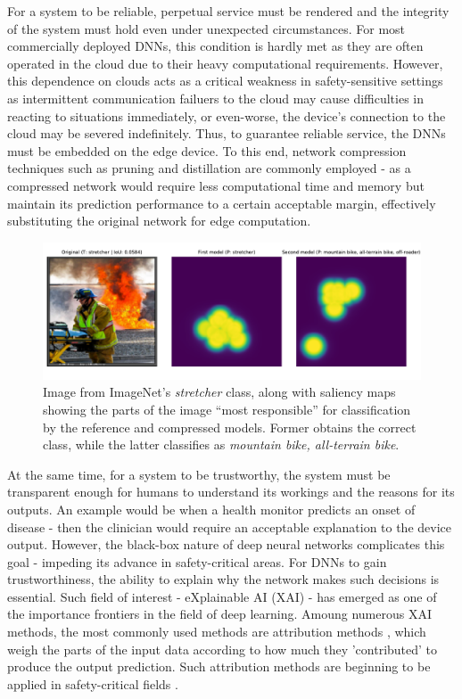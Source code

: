 For a system to be reliable, perpetual service 
must be rendered and the integrity of the system 
must hold even under unexpected circumstances.
%
%
For most commercially deployed DNNs, this condition 
is hardly met as they are often operated in the 
cloud due to their heavy computational requirements.
%
%
However, this dependence on clouds acts as a 
critical weakness in safety-sensitive settings 
as intermittent communication failuers to the 
cloud may cause difficulties in reacting to 
situations immediately, or even-worse, 
the device's connection to the cloud may be 
severed indefinitely.
%
%
Thus, to guarantee reliable service, 
the DNNs must be embedded on the edge device.
%
%
%
To this end, network compression techniques such 
as pruning \cite{han2015deep,li2016pruning} and distillation \cite{hinton2015distilling,zagoruyko2016paying} 
are commonly employed - as a compressed network 
would require less computational time and memory 
but maintain its prediction performance to a 
certain acceptable margin, effectively substituting 
the original network for edge computation.
\begin{figure}[!h]
    \centering
    \includegraphics[width=\linewidth]{img/fire.pdf}
    \caption{\small Image from ImageNet's \textit{stretcher} class, along with saliency maps showing the parts of the image ``most responsible'' for classification by the reference and compressed models. Former obtains the correct class, while the latter classifies as {\em mountain bike, all-terrain bike}.}
    \label{fig:fire}
\end{figure}
At the same time, for a system to be trustworthy, 
the system must be transparent enough for humans 
to understand its workings and the reasons for its outputs.
%
%
An example would be when a health monitor 
predicts an onset of disease \cite{xu2019current}
- then the clinician would require an acceptable
explanation to the device output.
%
%
However, the black-box nature of deep neural 
networks complicates this goal - impeding its 
advance in safety-critical areas.
%
%
For DNNs to gain trustworthiness, the ability 
to explain why the network makes such decisions 
is essential. Such field of interest - 
eXplainable AI (XAI) - has emerged as one of the 
importance frontiers in the field of deep learning.
%
%
Amoung numerous XAI methods, the most commonly 
used methods are attribution methods \cite{selvaraju2017grad}, 
which weigh the parts of the input data according to 
how much they 'contributed' to produce the output prediction.
%
%
Such attribution methods are beginning to be applied
in safety-critical fields \cite{liang2020prediction}.

